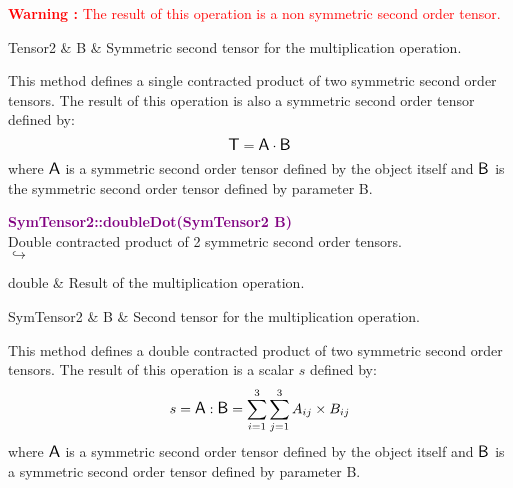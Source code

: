 \hspace*{10mm}\textcolor{red}{\textbf{Warning :}  The result of this operation is a non symmetric second order tensor.}

\begin{tcolorbox}[width=\textwidth,myArgs,tabularx={ll|R}]
Tensor2 & B & Symmetric second tensor for the multiplication operation.
\end{tcolorbox}

This method defines a single contracted product of two symmetric second order tensors.
The result of this operation is also a symmetric second order tensor defined by:
\begin{equation*}
\mbox{\large\ensuremath{\mathsf{T}}} = \mbox{\large\ensuremath{\mathsf{A}}} \cdot \mbox{\large\ensuremath{\mathsf{B}}}
\end{equation*}
where $\mbox{\large\ensuremath{\mathsf{A}}}$ is a symmetric second order tensor defined by the object itself and $\mbox{\large\ensuremath{\mathsf{B}}}$ is the symmetric second order tensor defined by parameter B.

\textcolor{purple}{\textbf{SymTensor2::doubleDot(SymTensor2 B)}}\label{SymTensor2::doubleDot(SymTensor2 B)}\\
Double contracted product of 2 symmetric second order tensors.\\ \hspace*{5mm}$\hookrightarrow$
\vspace*{-2em}\begin{tcolorbox}[grow to left by=-1cm, width=\textwidth-1cm,myArgs,tabularx={l|R}]
double & Result of the multiplication operation.
\end{tcolorbox}

\begin{tcolorbox}[width=\textwidth,myArgs,tabularx={ll|R}]
SymTensor2 & B & Second tensor for the multiplication operation.
\end{tcolorbox}

This method defines a double contracted product of two symmetric second order tensors.
The result of this operation is a scalar $s$ defined by:
\begin{equation*}
s = \mbox{\large\ensuremath{\mathsf{A}}} : \mbox{\large\ensuremath{\mathsf{B}}} = \sum_{i=1}^{3} \sum_{j=1}^{3} A_{ij}\times B_{ij}
\end{equation*}
where $\mbox{\large\ensuremath{\mathsf{A}}}$ is a symmetric second order tensor defined by the object itself and $\mbox{\large\ensuremath{\mathsf{B}}}$ is a symmetric second order tensor defined by parameter B.

